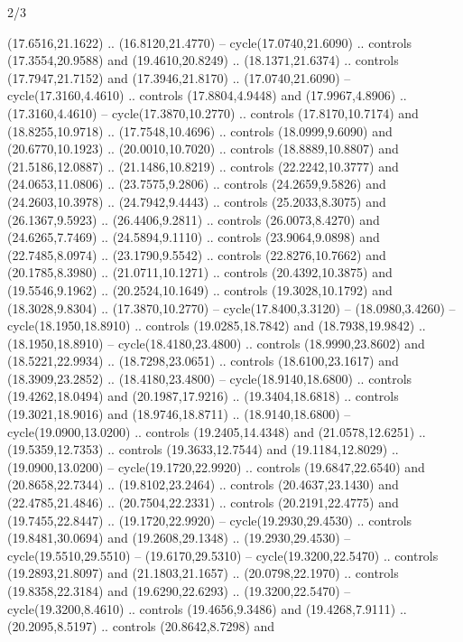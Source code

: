 \begin{flagdescription}{2/3}
\begin{scope}[yshift=\flagwidth,scale=\flagwidth/1241.93737]
\begin{scope}[y=-1mm, x=1mm,draw=gold,fill=blue,line join=miter,miter limit=4,line width=1.8\lw]
\begin{scope}[y=1mm, x=1mm, yscale=-1,shift={(573.68mm+\str,145.75)}]
\begin{scope}[scale=1.35,shift={(-9,-3)}]
\begin{scope}[scale=0.55]
\begin{scope}[scale=1.333]
    (17.6516,21.1622) .. (16.8120,21.4770) -- cycle(17.0740,21.6090) .. controls
    (17.3554,20.9588) and (19.4610,20.8249) .. (18.1371,21.6374) .. controls
    (17.7947,21.7152) and (17.3946,21.8170) .. (17.0740,21.6090) --
    cycle(17.3160,4.4610) .. controls (17.8804,4.9448) and (17.9967,4.8906) ..
    (17.3160,4.4610) -- cycle(17.3870,10.2770) .. controls (17.8170,10.7174) and
    (18.8255,10.9718) .. (17.7548,10.4696) .. controls (18.0999,9.6090) and
    (20.6770,10.1923) .. (20.0010,10.7020) .. controls (18.8889,10.8807) and
    (21.5186,12.0887) .. (21.1486,10.8219) .. controls (22.2242,10.3777) and
    (24.0653,11.0806) .. (23.7575,9.2806) .. controls (24.2659,9.5826) and
    (24.2603,10.3978) .. (24.7942,9.4443) .. controls (25.2033,8.3075) and
    (26.1367,9.5923) .. (26.4406,9.2811) .. controls (26.0073,8.4270) and
    (24.6265,7.7469) .. (24.5894,9.1110) .. controls (23.9064,9.0898) and
    (22.7485,8.0974) .. (23.1790,9.5542) .. controls (22.8276,10.7662) and
    (20.1785,8.3980) .. (21.0711,10.1271) .. controls (20.4392,10.3875) and
    (19.5546,9.1962) .. (20.2524,10.1649) .. controls (19.3028,10.1792) and
    (18.3028,9.8304) .. (17.3870,10.2770) -- cycle(17.8400,3.3120) --
    (18.0980,3.4260) -- cycle(18.1950,18.8910) .. controls (19.0285,18.7842) and
    (18.7938,19.9842) .. (18.1950,18.8910) -- cycle(18.4180,23.4800) .. controls
    (18.9990,23.8602) and (18.5221,22.9934) .. (18.7298,23.0651) .. controls
    (18.6100,23.1617) and (18.3909,23.2852) .. (18.4180,23.4800) --
    cycle(18.9140,18.6800) .. controls (19.4262,18.0494) and (20.1987,17.9216) ..
    (19.3404,18.6818) .. controls (19.3021,18.9016) and (18.9746,18.8711) ..
    (18.9140,18.6800) -- cycle(19.0900,13.0200) .. controls (19.2405,14.4348) and
    (21.0578,12.6251) .. (19.5359,12.7353) .. controls (19.3633,12.7544) and
    (19.1184,12.8029) .. (19.0900,13.0200) -- cycle(19.1720,22.9920) .. controls
    (19.6847,22.6540) and (20.8658,22.7344) .. (19.8102,23.2464) .. controls
    (20.4637,23.1430) and (22.4785,21.4846) .. (20.7504,22.2331) .. controls
    (20.2191,22.4775) and (19.7455,22.8447) .. (19.1720,22.9920) --
    cycle(19.2930,29.4530) .. controls (19.8481,30.0694) and (19.2608,29.1348) ..
    (19.2930,29.4530) -- cycle(19.5510,29.5510) -- (19.6170,29.5310) --
    cycle(19.3200,22.5470) .. controls (19.2893,21.8097) and (21.1803,21.1657) ..
    (20.0798,22.1970) .. controls (19.8358,22.3184) and (19.6290,22.6293) ..
    (19.3200,22.5470) -- cycle(19.3200,8.4610) .. controls (19.4656,9.3486) and
    (19.4268,7.9111) .. (20.2095,8.5197) .. controls (20.8642,8.7298) and

\end{scope}
\end{scope}
\end{scope}
\end{scope}
\end{scope}
\end{scope}
\end{flagdescription}
